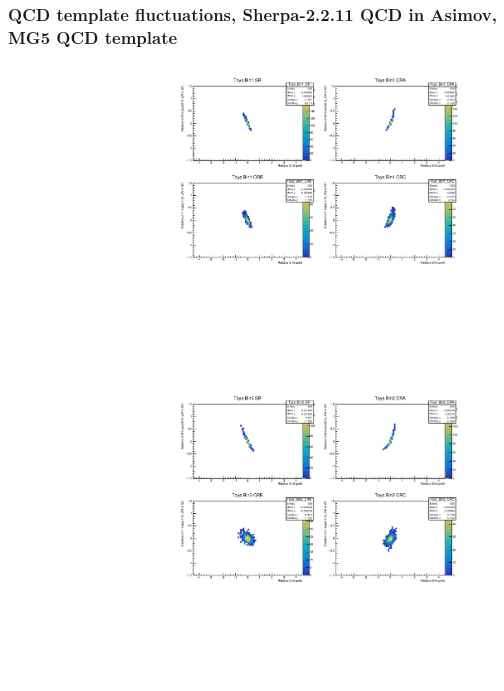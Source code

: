 \subsubsection{\mjj QCD template fluctuations, Sherpa-2.2.11 QCD in Asimov, MG5 QCD template}
\begin{figure}[H]
\includegraphics[width=\textwidth]{plots/diffx/instab/linearfx/instabilities_mjj_QCD_Mgraph_Signal_Sh2211_BSMCQCDSTATS_linearfx_newbinning_sherpaasimov_bin1.pdf}
\end{figure}
\begin{figure}[H]
\includegraphics[width=\textwidth]{plots/diffx/instab/linearfx/instabilities_mjj_QCD_Mgraph_Signal_Sh2211_BSMCQCDSTATS_linearfx_newbinning_sherpaasimov_bin2.pdf}
\end{figure}
